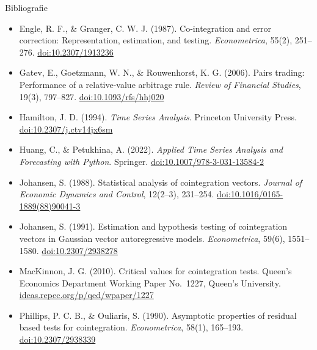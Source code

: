 \begin{frame}{Bibliografie}
\itemsize{\tiny}
\begin{itemize}
    \item Engle, R. F., \& Granger, C. W. J. (1987). Co-integration and error correction: Representation, estimation, and testing. \textit{Econometrica}, 55(2), 251--276. \href{https://doi.org/10.2307/1913236}{doi:10.2307/1913236}
    \item Gatev, E., Goetzmann, W. N., \& Rouwenhorst, K. G. (2006). Pairs trading: Performance of a relative-value arbitrage rule. \textit{Review of Financial Studies}, 19(3), 797--827. \href{https://doi.org/10.1093/rfs/hhj020}{doi:10.1093/rfs/hhj020}
    \item Hamilton, J. D. (1994). \textit{Time Series Analysis}. Princeton University Press. \href{https://doi.org/10.2307/j.ctv14jx6sm}{doi:10.2307/j.ctv14jx6sm}
    \item Huang, C., \& Petukhina, A. (2022). \textit{Applied Time Series Analysis and Forecasting with Python}. Springer. \href{https://doi.org/10.1007/978-3-031-13584-2}{doi:10.1007/978-3-031-13584-2}
    \item Johansen, S. (1988). Statistical analysis of cointegration vectors. \textit{Journal of Economic Dynamics and Control}, 12(2--3), 231--254. \href{https://doi.org/10.1016/0165-1889(88)90041-3}{doi:10.1016/0165-1889(88)90041-3}
    \item Johansen, S. (1991). Estimation and hypothesis testing of cointegration vectors in Gaussian vector autoregressive models. \textit{Econometrica}, 59(6), 1551--1580. \href{https://doi.org/10.2307/2938278}{doi:10.2307/2938278}
    \item MacKinnon, J. G. (2010). Critical values for cointegration tests. Queen's Economics Department Working Paper No.~1227, Queen's University. \href{https://ideas.repec.org/p/qed/wpaper/1227.html}{ideas.repec.org/p/qed/wpaper/1227}
    \item Phillips, P. C. B., \& Ouliaris, S. (1990). Asymptotic properties of residual based tests for cointegration. \textit{Econometrica}, 58(1), 165--193. \href{https://doi.org/10.2307/2938339}{doi:10.2307/2938339}
\end{itemize}
\end{frame}


